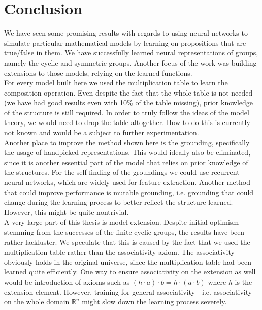 \chapter*{Conclusion}
We have seen some promising results with regards to using neural networks to simulate particular mathematical models by learning on propositions that are true/false in them. We have successfully learned neural representations of groups, namely the cyclic and symmetric groups. Another focus of the work was building extensions to those models, relying on the learned functions.\\

For every model built here we used the multiplication table to learn the composition operation. Even despite the fact that the whole table is not needed (we have had good results even with 10\% of the table missing), prior knowledge of the structure is still required. In order to truly follow the ideas of the model theory, we would need to drop the table altogether. How to do this is currently not known and would be a subject to further experimentation.\\

Another place to improve the method shown here is the grounding, specifically the usage of handpicked representations. This would ideally also be eliminated, since it is another essential part of the model that relies on prior knowledge of the structures. For the self-finding of the groundings we could use recurrent neural networks, which are widely used for feature extraction. Another method that could improve performance is mutable grounding, i.e. grounding that could change during the learning process to better reflect the structure learned. However, this might be quite nontrivial.\\

A very large part of this thesis is model extension. Despite initial optimism stemming from the successes of the finite cyclic groups, the results have been rather lackluster. We speculate that this is caused by the fact that we used the multiplication table rather than the associativity axiom. The associativity obviously holds in the original universe, since the multiplication table had been learned quite efficiently. One way to ensure associativity on the extension as well would be introduction of axioms such as $(h\cdot a)\cdot b = h\cdot (a\cdot b)$ where $h$ is the extension element. However, training for general associativity - i.e. associativity on the whole domain $\mathbb{R}^n$ might slow down the learning process severely.\\

